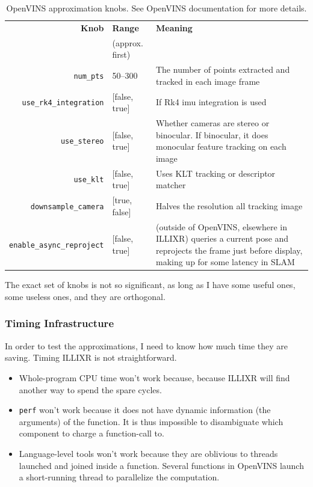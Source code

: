 \begin{table}
  \centering
  {
    \caption{OpenVINS approximation knobs. See OpenVINS documentation for more details\cite{Geneva2020ICRA}.}
    \begin{tabularx}{\linewidth}{r||l|X}
      \textbf{Knob} & \textbf{Range} & \textbf{Meaning} \\
      & {(approx. first)} & \\
      \hline\hline
      \verb+num_pts+ & 50--300 & The number of points extracted and tracked in each image frame \\
      \verb+use_rk4_integration+ & [false, true] & If Rk4 imu integration is used\\
      \verb+use_stereo+ & [false, true] & Whether cameras are stereo or binocular. If binocular, it does monocular feature tracking on each image \\
      \verb+use_klt+ & [false, true] & Uses KLT tracking or descriptor matcher \\
      \verb+downsample_camera+ & [true, false] & Halves the resolution all tracking image \\
      \verb+enable_async_reproject+ & [false, true] & (outside of OpenVINS, elsewhere in ILLIXR) queries a current pose and reprojects the frame just before display, making up for some latency in SLAM \\
    \end{tabularx}
  }
\end{table}

The exact set of knobs is not so significant, as long as I have some useful ones, some useless ones, and they are orthogonal.

\subsubsection{Timing Infrastructure}

In order to test the approximations, I need to know how much time they are saving. Timing ILLIXR is not straightforward.
\begin{itemize}
\item Whole-program CPU time won't work because, because ILLIXR will find another way to spend the spare cycles.
\item \verb+perf+ won't work because it does not have dynamic information (the arguments) of the function. It is thus impossible to disambiguate which component to charge a function-call to.
\item Language-level tools won't work because they are oblivious to threads launched and joined inside a function. Several functions in OpenVINS launch a short-running thread to parallelize the computation.
\end{itemize}

